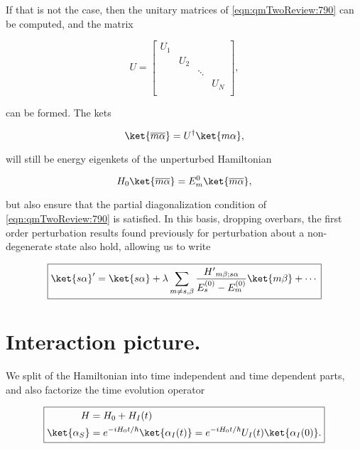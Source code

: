 If that is not the case, then the unitary matrices of \ref{eqn:qmTwoReview:790} can be computed, and the matrix

\begin{equation}\label{eqn:pertubationDegeneracy:230}
U = 
\begin{bmatrix}
U_1 &   	&  	 & \\
    & U_2 	&  	 & \\
    &     	& \ddots & \\
    &     	&        & U_N \\
\end{bmatrix},
\end{equation}

can be formed.  The kets

\begin{equation}\label{eqn:qmTwoReview:850}
\ket{\overline{m \alpha}} = U^\dagger \ket{m \alpha},
\end{equation}

will still be energy eigenkets of the unperturbed Hamiltonian

\begin{equation}\label{eqn:qmTwoReview:870}
H_0 \ket{\overline{m \alpha}} = E_m^0 \ket{\overline{m \alpha}},
\end{equation}

but also ensure that the partial diagonalization condition of \ref{eqn:qmTwoReview:790} is satisfied.  In this basis, dropping overbars, the first order perturbation results found previously for perturbation about a non-degenerate state also hold, allowing us to write

\begin{equation}\label{eqn:qmTwoReview:830}
\boxed{
\ket{s \alpha}' = \ket{s \alpha} 
+ \lambda \sum_{m \ne s, \beta} \frac{{H'}_{m \beta ; s \alpha}}{ E_s^{(0)} - E_m^{(0)} } \ket{m \beta}
+ \cdots
}
\end{equation}

\section{Interaction picture.}

We split of the Hamiltonian into time independent and time dependent parts, and also factorize the time evolution operator

\begin{equation}\label{eqn:qmTwoReview:390}
\boxed{
\begin{aligned}
H &= H_0 + H_I(t) \\
\ket{\alpha_S} &= e^{-i H_0 t/\hbar } \ket{\alpha_I(t)} = e^{-i H_0 t/\hbar } U_I(t) \ket{\alpha_I(0)} .
\end{aligned}
}
\end{equation}

